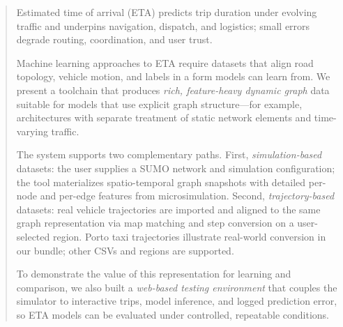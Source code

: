 \begin{abstract}
Estimated time of arrival (ETA) predicts trip duration under evolving traffic and underpins navigation, dispatch, and logistics; small errors degrade routing, coordination, and user trust.

Machine learning approaches to ETA require datasets that align road topology, vehicle motion, and labels in a form models can learn from.
We present a toolchain that produces \emph{rich, feature-heavy dynamic graph} data suitable for models that use explicit graph structure---for example, architectures with separate treatment of static network elements and time-varying traffic.

The system supports two complementary paths.
First, \emph{simulation-based} datasets: the user supplies a SUMO network and simulation configuration; the tool materializes spatio-temporal graph snapshots with detailed per-node and per-edge features from microsimulation.
Second, \emph{trajectory-based} datasets: real vehicle trajectories are imported and aligned to the same graph representation via map matching and step conversion on a user-selected region.
Porto taxi trajectories illustrate real-world conversion in our bundle; other CSVs and regions are supported.

To demonstrate the value of this representation for learning and comparison, we also built a \emph{web-based testing environment} that couples the simulator to interactive trips, model inference, and logged prediction error, so ETA models can be evaluated under controlled, repeatable conditions.

\end{abstract}
